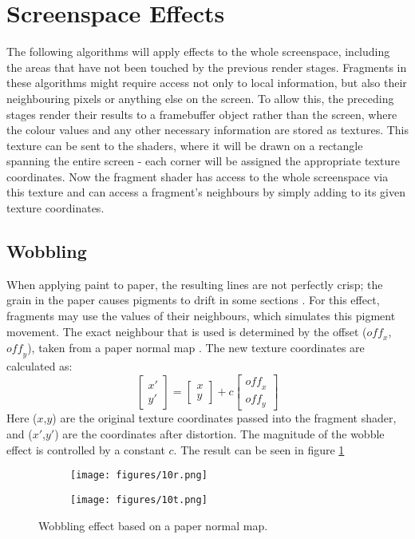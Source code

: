 \documentclass[a4paper, 12pt]{article}
\begin{document}

\section{Screenspace Effects}
The following algorithms will apply effects to the whole screenspace, including the areas that have not been touched by the previous render stages. Fragments in these algorithms might require access not only to local information, but also their neighbouring pixels or anything else on the screen. To allow this, the preceding stages render their results to a framebuffer object rather than the screen, where the colour values and any other necessary information are stored as textures. This texture can be sent to the shaders, where it will be drawn on a rectangle spanning the entire screen - each corner will be assigned the appropriate texture coordinates. Now the fragment shader has access to the whole screenspace via this texture and can access a fragment's neighbours by simply adding to its given texture coordinates.


\subsection{Wobbling}
When applying paint to paper, the resulting lines are not perfectly crisp; the grain in the paper causes pigments to drift in some sections \cite{Curtis1997}. For this effect, fragments may use the values of their neighbours, which simulates this pigment movement. The exact neighbour that is used is determined by the offset ($\mathit{off}_x$, $\mathit{off}_y$), taken from a paper normal map \cite{Nienhaus2005}. The new texture coordinates are calculated as:
$$\begin{bmatrix}x'\\y'\end{bmatrix} = \begin{bmatrix}x\\y\end{bmatrix} + c\begin{bmatrix}\mathit{off}_x\\\mathit{off}_y\end{bmatrix}$$
Here ($x$,$y$) are the original texture coordinates passed into the fragment shader, and ($x'$,$y'$) are the coordinates after distortion. The magnitude of the wobble effect is controlled by a constant $c$. The result can be seen in figure \ref{wobble}

\begin{figure}[htbp!]
  \centering
  \begin{subfigure}{0.5\columnwidth}
    \texttt{[image: figures/10r.png]}
  \end{subfigure}
  \begin{subfigure}{0.3\columnwidth}
    \texttt{[image: figures/10t.png]}
  \end{subfigure}
  \caption{Wobbling effect based on a paper normal map.}
  \label{wobble}
\end{figure}
\end{document}
